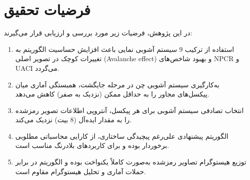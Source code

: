 \documentclass[a4paper,12pt]{report}
\renewcommand{\%}{\lr{\oldpercent}}
\providecommand{\lr}[1]{#1}
\begin{document}
\section{فرضیات تحقیق}
در این پژوهش، فرضیات زیر مورد بررسی و ارزیابی قرار می‌گیرند:
\begin{enumerate}
    \item استفاده از ترکیب 9 سیستم آشوبی نمایی باعث افزایش حساسیت الگوریتم به تغییرات کوچک در تصویر اصلی (\lr{Avalanche effect}) و بهبود شاخص‌های \lr{NPCR} و \lr{UACI} می‌گردد.
    \item به‌کارگیری سیستم آشوبی چن در مرحله جایگشت، همبستگی آماری میان پیکسل‌های مجاور را به حداقل ممکن (نزدیک به صفر) کاهش می‌دهد.
    \item انتخاب تصادفی سیستم آشوبی برای هر پیکسل، آنتروپی اطلاعات تصویر رمزشده را به مقدار ایده‌آل (8 بیت) نزدیک می‌کند.
    \item الگوریتم پیشنهادی علی‌رغم پیچیدگی ساختاری، از کارایی محاسباتی مطلوبی برخوردار بوده و برای کاربردهای بلادرنگ مناسب است.
    \item توزیع هیستوگرام تصاویر رمزشده به‌صورت کاملاً یکنواخت بوده و الگوریتم در برابر حملات آماری و تحلیل هیستوگرام مقاوم است.
\end{enumerate}
\end{document}
